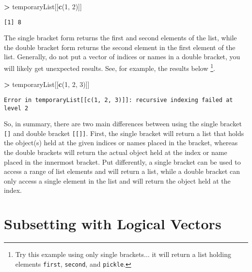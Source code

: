 \documentclass[]{krantz}
\makeatletter
\newenvironment{Shaded}{\begin{snugshade}}{\end{snugshade}}
\newcommand{\KeywordTok}[1]{\textcolor[rgb]{0.27,0.27,0.27}{\textbf{#1}}}
\newcommand{\DecValTok}[1]{\textcolor[rgb]{0.06,0.06,0.06}{#1}}
\newcommand{\StringTok}[1]{\textcolor[rgb]{0.5,0.5,0.5}{#1}}
\newcommand{\OperatorTok}[1]{\textcolor[rgb]{0.43,0.43,0.43}{\textbf{#1}}}
\newcommand{\NormalTok}[1]{#1}
\newenvironment{kframe}{%
\medskip{}
\setlength{\fboxsep}{.8em}
 \def\at@end@of@kframe{}%
 \ifinner\ifhmode%
  \def\at@end@of@kframe{\end{minipage}}%
  \begin{minipage}{\columnwidth}%
 \fi\fi%
 \def\FrameCommand##1{\hskip\@totalleftmargin \hskip-\fboxsep
 \colorbox{shadecolor}{##1}\hskip-\fboxsep
     \hskip-\linewidth \hskip-\@totalleftmargin \hskip\columnwidth}%
 \MakeFramed {\advance\hsize-\width
   \@totalleftmargin\z@ \linewidth\hsize
   \@setminipage}}%
 {\par\unskip\endMakeFramed%
 \at@end@of@kframe}
\renewenvironment{Shaded}{\begin{kframe}}{\end{kframe}}
\theoremstyle{definition}
\theoremstyle{definition}
\theoremstyle{definition}
\theoremstyle{remark}
\makeatother
\begin{document}
\begin{Shaded}
\begin{Highlighting}[]
\OperatorTok{>}\StringTok{ }\NormalTok{temporaryList[[}\KeywordTok{c}\NormalTok{(}\DecValTok{1}\NormalTok{, }\DecValTok{2}\NormalTok{)]]}
\end{Highlighting}
\end{Shaded}

\begin{verbatim}
[1] 8
\end{verbatim}

The single bracket form returns the first and second elements of the
list, while the double bracket form returns the second element in the
first element of the list. Generally, do not put a vector of indices or
names in a double bracket, you will likely get unexpected results. See,
for example, the results below \footnote{Try this example using only
  single brackets\(\ldots\) it will return a list holding elements
  \texttt{first}, \texttt{second}, and \texttt{pickle}.}.

\begin{Shaded}
\begin{Highlighting}[]
\OperatorTok{>}\StringTok{ }\NormalTok{temporaryList[[}\KeywordTok{c}\NormalTok{(}\DecValTok{1}\NormalTok{, }\DecValTok{2}\NormalTok{, }\DecValTok{3}\NormalTok{)]]}
\end{Highlighting}
\end{Shaded}

\begin{verbatim}
Error in temporaryList[[c(1, 2, 3)]]: recursive indexing failed at level 2
\end{verbatim}

So, in summary, there are two main differences between using the single
bracket \texttt{{[}{]}} and double bracket \texttt{{[}{[}{]}{]}}. First,
the single bracket will return a list that holds the object(s) held at
the given indices or names placed in the bracket, whereas the double
brackets will return the actual object held at the index or name placed
in the innermost bracket. Put differently, a single bracket can be used
to access a range of list elements and will return a list, while a
double bracket can only access a single element in the list and will
return the object held at the index.

\section{Subsetting with Logical
Vectors}\label{subsetting-with-logical-vectors}
\end{document}
